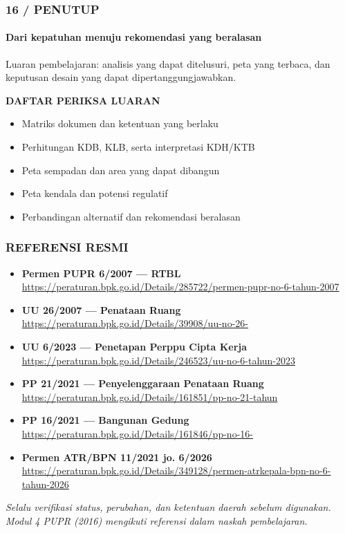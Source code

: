 \documentclass[../main.tex]{subfiles}
\begin{document}
\begin{frame}[mytitle=center,c,mycolor=digiPH_gray!20]
	\frametitle{16 / PENUTUP}
	\framesubtitle{Dari kepatuhan menuju rekomendasi yang beralasan}

	Luaran pembelajaran: analisis yang dapat ditelusuri, peta yang terbaca, dan keputusan desain yang dapat dipertanggungjawabkan.

	\vspace{0.4cm}
	\textbf{DAFTAR PERIKSA LUARAN}
	\begin{itemize}
		\item[\checkmark] Matriks dokumen dan ketentuan yang berlaku
		\item[\checkmark] Perhitungan KDB, KLB, serta interpretasi KDH/KTB
		\item[\checkmark] Peta sempadan dan area yang dapat dibangun
		\item[\checkmark] Peta kendala dan potensi regulatif
		\item[\checkmark] Perbandingan alternatif dan rekomendasi beralasan
	\end{itemize}
\end{frame}

\begin{frame}[mytitle=standard,t]
	\frametitle{REFERENSI RESMI}

	\begin{itemize}
		\item \textbf{Permen PUPR 6/2007 — RTBL}\\ \url{https://peraturan.bpk.go.id/Details/285722/permen-pupr-no-6-tahun-2007}
		\item \textbf{UU 26/2007 — Penataan Ruang}\\ \url{https://peraturan.bpk.go.id/Details/39908/uu-no-26-}
		\item \textbf{UU 6/2023 — Penetapan Perppu Cipta Kerja}\\ \url{https://peraturan.bpk.go.id/Details/246523/uu-no-6-tahun-2023}
		\item \textbf{PP 21/2021 — Penyelenggaraan Penataan Ruang}\\ \url{https://peraturan.bpk.go.id/Details/161851/pp-no-21-tahun}
		\item \textbf{PP 16/2021 — Bangunan Gedung}\\ \url{https://peraturan.bpk.go.id/Details/161846/pp-no-16-}
		\item \textbf{Permen ATR/BPN 11/2021 jo. 6/2026}\\ \url{https://peraturan.bpk.go.id/Details/349128/permen-atrkepala-bpn-no-6-tahun-2026}
	\end{itemize}

	\vfill
	\footnotesize\textit{Selalu verifikasi status, perubahan, dan ketentuan daerah sebelum digunakan. Modul 4 PUPR (2016) mengikuti referensi dalam naskah pembelajaran.}
\end{frame}
\end{document}
